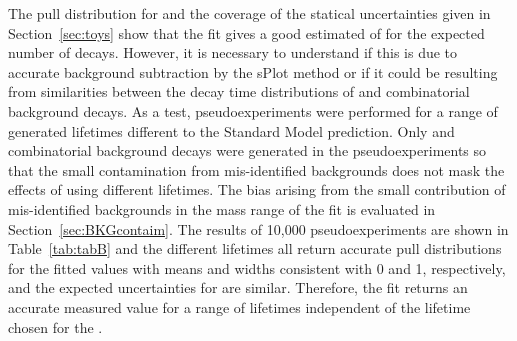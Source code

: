 The pull distribution for \Gmumu and the coverage of the statical uncertainties given in Section~\ref{sec:toys} show that the fit gives a good estimated of \tmumu for the expected number of decays. However, it is necessary to understand if this is due to accurate background subtraction by the sPlot method or if it could be resulting from similarities between the decay time distributions of \bsmumu and combinatorial background decays. As a test, pseudoexperiments were performed for a range of generated \bsmumu lifetimes different to the Standard Model prediction. Only \bsmumu and combinatorial background decays were generated in the pseudoexperiments so that the small contamination from mis-identified backgrounds does not mask the effects of using different lifetimes. The bias arising from the small contribution of mis-identified backgrounds in the mass range of the fit is evaluated in Section~\ref{sec:BKGcontaim}. The results of 10,000 pseudoexperiments are shown in Table~\ref{tab:tabB} and the different lifetimes all return accurate pull distributions for the fitted \Gmumu values with means and widths consistent with 0 and 1, respectively, and the expected uncertainties for \tmumu are similar. Therefore, the fit returns an accurate measured value for a range of \bsmumu lifetimes independent of the lifetime chosen for the \bs.
